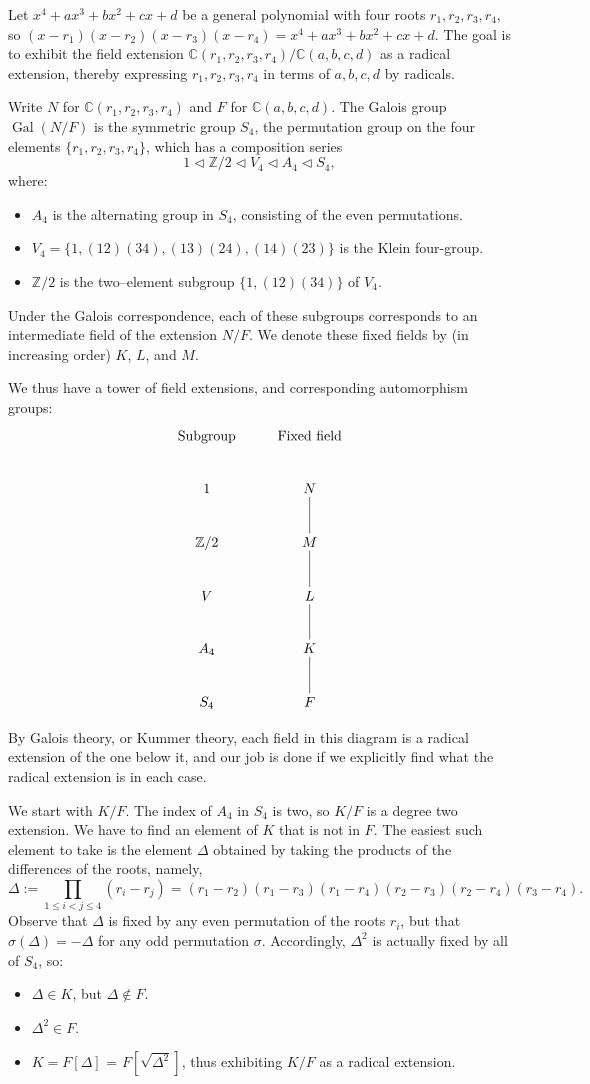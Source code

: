 \documentclass[12pt]{article}
\newcommand{\C}{\mathbb{C}}
\newcommand{\Z}{\mathbb{Z}}
\newcommand{\Gal}{\operatorname{Gal}}
\begin{document}
Let $x^4 + ax^3 + bx^2 + cx + d$ be a general polynomial with four roots
$r_1,r_2,r_3,r_4$, so $(x-r_1)(x-r_2)(x-r_3)(x-r_4) = x^4 + ax^3 +
bx^2 + cx + d$. The goal is to exhibit the field extension
$\C(r_1,r_2,r_3,r_4)/\C(a,b,c,d)$ as a radical extension, thereby
expressing $r_1,r_2,r_3,r_4$ in terms of $a,b,c,d$ by radicals.

Write $N$ for $\C(r_1,r_2,r_3,r_4)$ and $F$ for $\C(a,b,c,d)$. The
Galois group $\Gal(N/F)$ is the symmetric group $S_4$, the permutation group on the four elements $\{r_1,r_2,r_3,r_4\}$, which has a composition series
$$
1 \lhd \Z/2 \lhd V_4 \lhd A_4 \lhd S_4,
$$
where:
\begin{itemize}
\item $A_4$ is the alternating group in $S_4$, consisting of the even
  permutations.
\item $V_4 = \{1, (12)(34), (13)(24), (14)(23)\}$ is the Klein four-group.
\item $\Z/2$ is the two--element subgroup $\{1, (12)(34)\}$ of $V_4$.
\end{itemize}

Under the Galois correspondence, each of these subgroups corresponds
to an intermediate field of the extension $N/F$. We denote these fixed
fields by  (in increasing order) $K$, $L$, and $M$.

We thus have a tower of field extensions, and corresponding
automorphism groups:
$$
\xymatrix{
\text{Subgroup} & \text{Fixed field} \\
1 & N \ar@{-}[d] \\
\Z/2 & M \ar@{-}[d] \\
V & L \ar@{-}[d] \\
A_4 & K \ar@{-}[d] \\
S_4 & F
}
$$

By Galois theory, or Kummer theory, each field in this diagram is a radical
extension of the one below it, and our job is done if we explicitly
find what the radical extension is in each case.

We start with $K/F$. The index of $A_4$ in $S_4$ is two, so $K/F$ is a
degree two extension. We have to find an element of $K$ that is not in
$F$. The easiest such element to take is the element $\Delta$ obtained by taking the products of the differences of the roots, namely,
$$
\Delta := \prod_{1 \leq i < j \leq 4} (r_i - r_j) = (r_1-r_2)
(r_1-r_3) (r_1-r_4) (r_2-r_3) (r_2-r_4) (r_3-r_4).
$$
Observe that $\Delta$ is fixed by any even permutation of the roots
$r_i$, but that $\sigma(\Delta) = -\Delta$ for any odd permutation
$\sigma$. Accordingly, $\Delta^2$ is actually
fixed by all of $S_4$, so:
\begin{itemize}
\item $\Delta \in K$, but $\Delta \notin F$.
\item $\Delta^2 \in F$.
\item $K = F[\Delta]$ = $F[\sqrt{\Delta^2}]$, thus exhibiting $K/F$ as
  a radical extension.
\end{itemize}
\end{document}
